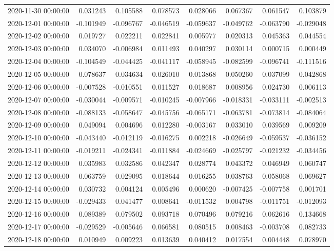 \begin{tabular}{lrrrrrrr}
2020-11-30 00:00:00 & 0.031243 & 0.105588 & 0.078573 & 0.028066 & 0.067367 & 0.061547 & 0.103879 \\
2020-12-01 00:00:00 & -0.101949 & -0.096767 & -0.046519 & -0.059637 & -0.049762 & -0.063790 & -0.029048 \\
2020-12-02 00:00:00 & 0.019727 & 0.022211 & 0.022841 & 0.005977 & 0.020313 & 0.045363 & 0.044554 \\
2020-12-03 00:00:00 & 0.034070 & -0.006984 & 0.011493 & 0.040297 & 0.030114 & 0.000715 & 0.000449 \\
2020-12-04 00:00:00 & -0.104549 & -0.044425 & -0.041117 & -0.058945 & -0.082599 & -0.096741 & -0.111516 \\
2020-12-05 00:00:00 & 0.078637 & 0.034634 & 0.026010 & 0.013868 & 0.050260 & 0.037099 & 0.042868 \\
2020-12-06 00:00:00 & -0.007528 & -0.010551 & 0.011527 & 0.018687 & 0.008956 & 0.024730 & 0.006113 \\
2020-12-07 00:00:00 & -0.030044 & -0.009571 & -0.010245 & -0.007966 & -0.018331 & -0.033111 & -0.002513 \\
2020-12-08 00:00:00 & -0.088133 & -0.058647 & -0.045756 & -0.065171 & -0.063781 & -0.073814 & -0.084064 \\
2020-12-09 00:00:00 & 0.049094 & 0.004696 & 0.012280 & -0.003167 & 0.033010 & 0.039569 & 0.009209 \\
2020-12-10 00:00:00 & -0.043440 & -0.012119 & -0.016275 & 0.002218 & -0.026649 & -0.059537 & -0.036152 \\
2020-12-11 00:00:00 & -0.019211 & -0.024341 & -0.011884 & -0.024669 & -0.025797 & -0.021232 & -0.034456 \\
2020-12-12 00:00:00 & 0.035983 & 0.032586 & 0.042347 & 0.028774 & 0.043372 & 0.046949 & 0.060747 \\
2020-12-13 00:00:00 & 0.063759 & 0.029095 & 0.018644 & 0.016255 & 0.038763 & 0.058068 & 0.069627 \\
2020-12-14 00:00:00 & 0.030732 & 0.004124 & 0.005496 & 0.000620 & -0.007425 & -0.007758 & 0.001701 \\
2020-12-15 00:00:00 & -0.029433 & 0.041477 & 0.008641 & -0.011532 & 0.004798 & -0.011751 & -0.012093 \\
2020-12-16 00:00:00 & 0.089389 & 0.079502 & 0.093718 & 0.070496 & 0.079216 & 0.062616 & 0.134668 \\
2020-12-17 00:00:00 & -0.029529 & -0.005646 & 0.066581 & 0.080515 & 0.008463 & -0.003708 & 0.082733 \\
2020-12-18 00:00:00 & 0.010949 & 0.009223 & 0.013639 & 0.040412 & 0.017554 & 0.004448 & 0.078970 \\

\end{tabular}
